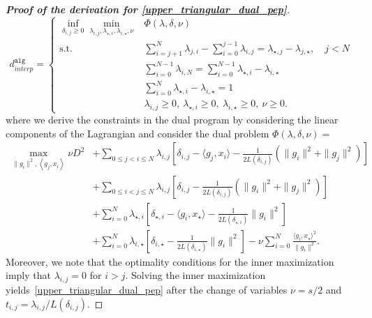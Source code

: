 \documentclass[11pt, hidelinks]{article}
\numberwithin{equation}{section}
\theoremstyle{thmstyletwo}%
\numberwithin{equation}{section}
\newcommand{\inner}[2]{\left\langle {#1}, {#2} \right\rangle}
\newcommand{\dAlg}{d^\mathtt{alg}}
\begin{document}
\begin{proof}[\bf Proof of the derivation for \eqref{upper_triangular_dual_pep}]
\begin{equation}
\dAlg_{interp} = \begin{cases}
   \displaystyle \inf_{\delta_{i,j} \geq 0} \min_{\lambda_{i,j}, \lambda_{\star,i}, \lambda_{i,\star}, \nu} & \Phi(\lambda, \delta, \nu) \\
    \mathrm{s.t.} & \sum_{i=j+1}^{N} \lambda_{j,i} - \sum_{i=0}^{j-1} \lambda_{i,j} = \lambda_{\star,j}-\lambda_{j,\star}, \quad j < N \\
    & \sum_{i=0}^{N-1} \lambda_{i,N} = \sum_{i=0}^{N-1} \lambda_{\star,i}-\lambda_{i,\star} \\
    & \sum_{i=0}^{N} \lambda_{\star,i}-\lambda_{i,\star} = 1 \\
    & \lambda_{i,j} \geq 0, \ \lambda_{\star,i} \geq 0, \ \lambda_{i,\star} \geq 0, \ \nu \geq 0 .
\end{cases}
\end{equation}
where we derive the constraints in the dual program by considering the linear components of the Lagrangian and consider the dual problem $\Phi(\lambda, \delta, \nu) = $\begin{align*}
   \max_{\|g_i\|^2, \inner{g_j}{x_i}}  \nu D^2 
    &+ \textstyle\sum_{0 \leq j < i \leq N} \lambda_{i,j} \left[ \delta_{i,j} - \langle g_j, x_i \rangle - \frac{1}{2L(\delta_{i,j})}\left(\|g_i\|^2 + \|g_j\|^2\right) \right] \\
    & + \textstyle\sum_{0 \leq i < j \leq N} \lambda_{i,j} \left[ \delta_{i,j} - \frac{1}{2L(\delta_{i,j})}\left(\|g_i\|^2 + \|g_j\|^2\right) \right] \\
    & + \textstyle\sum_{i=0}^{N} \lambda_{\star,i} \left[ \delta_{\star,i} - \langle g_i, x_\star \rangle - \frac{1}{2L(\delta_{\star,i})}\|g_i\|^2 \right] \\
    & + \textstyle\sum_{i=0}^N \lambda_{i,\star}\left[\delta_{i,\star}-\frac{1}{2L(\delta_{i,\star})}\|g_i\|^2\right]- \nu \sum_{i=0}^{N} \frac{\langle g_i, x_\star \rangle^2}{\|g_i\|^2}.
\end{align*}
Moreover, we note that the optimality conditions for the inner maximization imply that $\lambda_{i,j} = 0$ for $i > j$. Solving the inner maximization yields~\eqref{upper_triangular_dual_pep} after the change of variables  $\nu = s/2$ and $t_{i,j} = \lambda_{i,j}/L(\delta_{i,j})$.


\end{proof}
\end{document}
